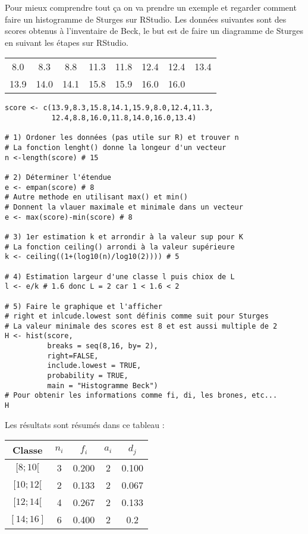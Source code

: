 \documentclass{report}
\begin{document}
Pour mieux comprendre tout ça on va prendre un exemple et regarder comment faire un histogramme de Sturges sur RStudio. Les données suivantes sont des scores obtenus à l'inventaire de Beck, le but est de faire un diagramme de Sturges en suivant les étapes sur RStudio.
\begin{center}
\begin{tabular}{ c c c c c c c c }
8.0 &8.3& 8.8 &11.3& 11.8 &12.4& 12.4&13.4  \\
13.9& 14.0& 14.1& 15.8& 15.9& 16.0 &16.0 \\
\end{tabular}
\end{center}
\newpage

\begin{verbatim}
score <- c(13.9,8.3,15.8,14.1,15.9,8.0,12.4,11.3, 
           12.4,8.8,16.0,11.8,14.0,16.0,13.4)

# 1) Ordoner les données (pas utile sur R) et trouver n
# La fonction lenght() donne la longeur d'un vecteur
n <-length(score) # 15

# 2) Déterminer l'étendue 
e <- empan(score) # 8
# Autre methode en utilisant max() et min() 
# Donnent la vlauer maximale et minimale dans un vecteur
e <- max(score)-min(score) # 8

# 3) 1er estimation k et arrondir à la valeur sup pour K
# La fonction ceiling() arrondi à la valeur supérieure 
k <- ceiling((1+(log10(n)/log10(2)))) # 5

# 4) Estimation largeur d'une classe l puis chiox de L
l <- e/k # 1.6 donc L = 2 car 1 < 1.6 < 2

# 5) Faire le graphique et l'afficher
# right et inlcude.lowest sont définis comme suit pour Sturges
# La valeur minimale des scores est 8 et est aussi multiple de 2
H <- hist(score,
          breaks = seq(8,16, by= 2),
          right=FALSE,
          include.lowest = TRUE,
          probability = TRUE,
          main = "Histogramme Beck")
# Pour obtenir les informations comme fi, di, les brones, etc...
H
\end{verbatim}
Les résultats sont résumés dans ce tableau :

\quad
\begin{center}
\begin{tabular}{ c c c c c }
\hline
Classe & $n_i$&$f_i$&$a_i$&$d_j$ \\
\hline
$[8;10[$ & 3 & 0.200 & 2 & 0.100 \\
$[10;12[$ & 2 & 0.133 & 2 & 0.067 \\
$[12;14[$ & 4 & 0.267 & 2 & 0.133  \\
$[14;16]$ & 6 & 0.400 & 2 & 0.2  \\
\hline
\end{tabular}
\end{center}
\quad
\end{document}

